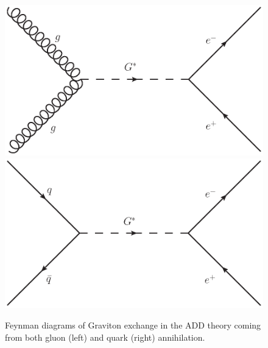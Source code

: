         \begin{figure}[h]
            \begin{center}
            \includegraphics[width=0.45\linewidth]{images/Gvirtual_gg_ee.eps}
            \includegraphics[width=0.45\linewidth]{images/Gvirtual_qq_ee.eps}
            \end{center}
            \caption{Feynman diagrams of Graviton exchange in the ADD theory coming from both gluon (left) and quark (right) annihilation.}
            \label{fig:fdADD}
        \end{figure}

